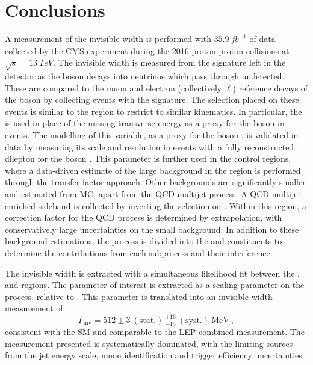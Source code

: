 \chapter{Conclusions}
\label{chap:summary}


A measurement of the \PZ invisible width is performed with $\SI{35.9}{fb^{-1}}$ of data collected by the CMS experiment during the 2016 proton-proton collisions at $\sqrt{s}=\SI{13}{TeV}$. The invisible width is measured from the \metplusjets signature left in the detector as the \PZ boson decays into neutrinos which pass through undetected. These are compared to the muon and electron (collectively $\ell$) reference decays of the \PZ boson by collecting events with the \diellplusjets signature. The selection placed on these events is similar to the \metplusjets region to restrict to similar kinematics. In particular, the \recoil is used in place of the missing transverse energy as a proxy for the boson \pt in \IVj events. The modelling of this variable, as a proxy for the boson \pt, is validated in data by measuring its scale and resolution in events with a fully reconstructed dilepton for the boson \pt. This parameter is further used in the \ellplusjets control regions, where a data-driven estimate of the large \IWlvj background in the \metplusjets region is performed through the transfer factor approach.  Other backgrounds are significantly smaller and estimated from MC, apart from the QCD multijet process. A QCD multijet enriched sideband is collected by inverting the selection on \mindphi. Within this region, a correction factor for the QCD process is determined by extrapolation, with conservatively large uncertainties on the small background. In addition to these background estimations, the \IDYll process is divided into the \IZll and \Igstarll constituents to determine the contributions from each subprocess and their interference.

The invisible width is extracted with a simultaneous likelihood fit between the \metplusjets, \ellplusjets and \diellplusjets regions. The parameter of interest is extracted as a scaling parameter on the \IZvvj process, relative to \IZllj.  This parameter is translated into an invisible width measurement of
%
\begin{equation}
    \Gamma_{\mathrm{inv}} = 512 \pm 3\ (\mathrm{stat.})\ ^{+16}_{-15}\ (\mathrm{syst.})\ \mathrm{MeV}\ ,
\end{equation}
%
consistent with the SM and comparable to the LEP combined measurement. The measurement presented is systematically dominated, with the limiting sources from the jet energy scale, muon identification and trigger efficiency uncertainties.

